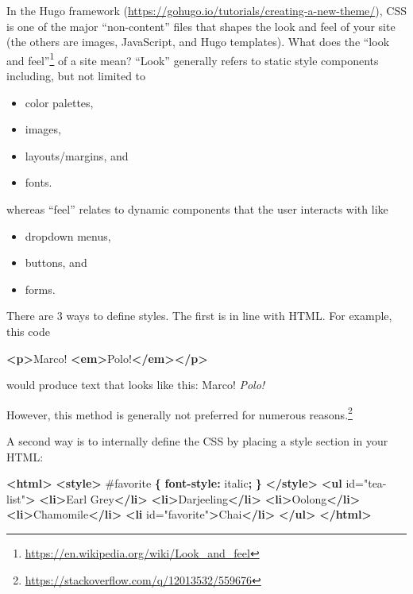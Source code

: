 \documentclass[12pt,]{krantz}
\makeatletter
\newenvironment{Shaded}{\begin{snugshade}}{\end{snugshade}}
\newcommand{\KeywordTok}[1]{\textcolor[rgb]{0.13,0.29,0.53}{\textbf{#1}}}
\newcommand{\DataTypeTok}[1]{\textcolor[rgb]{0.13,0.29,0.53}{#1}}
\newcommand{\FloatTok}[1]{\textcolor[rgb]{0.00,0.00,0.81}{#1}}
\newcommand{\StringTok}[1]{\textcolor[rgb]{0.31,0.60,0.02}{#1}}
\newcommand{\OtherTok}[1]{\textcolor[rgb]{0.56,0.35,0.01}{#1}}
\newcommand{\NormalTok}[1]{#1}
\providecommand{\tightlist}{%
  \setlength{\itemsep}{0pt}\setlength{\parskip}{0pt}}
\renewcommand{\href}[2]{#2\footnote{\url{#1}}}
\newenvironment{kframe}{%
\medskip{}
\setlength{\fboxsep}{.8em}
 \def\at@end@of@kframe{}%
 \ifinner\ifhmode%
  \def\at@end@of@kframe{\end{minipage}}%
  \begin{minipage}{\columnwidth}%
 \fi\fi%
 \def\FrameCommand##1{\hskip\@totalleftmargin \hskip-\fboxsep
 \colorbox{shadecolor}{##1}\hskip-\fboxsep
     \hskip-\linewidth \hskip-\@totalleftmargin \hskip\columnwidth}%
 \MakeFramed {\advance\hsize-\width
   \@totalleftmargin\z@ \linewidth\hsize
   \@setminipage}}%
 {\par\unskip\endMakeFramed%
 \at@end@of@kframe}
\renewenvironment{Shaded}{\begin{kframe}}{\end{kframe}}
\theoremstyle{definition}
\theoremstyle{definition}
\theoremstyle{definition}
\theoremstyle{remark}
\makeatother
\begin{document}
In the Hugo framework
(\url{https://gohugo.io/tutorials/creating-a-new-theme/}), CSS is one of
the major ``non-content'' files that shapes the look and feel of your
site (the others are images, JavaScript, and Hugo templates). What does
the \href{https://en.wikipedia.org/wiki/Look_and_feel}{``look and
feel''} of a site mean? ``Look'' generally refers to static style
components including, but not limited to

\begin{itemize}
\tightlist
\item
  color palettes,
\item
  images,
\item
  layouts/margins, and
\item
  fonts.
\end{itemize}

whereas ``feel'' relates to dynamic components that the user interacts
with like

\begin{itemize}
\tightlist
\item
  dropdown menus,
\item
  buttons, and
\item
  forms.
\end{itemize}

There are 3 ways to define styles. The first is in line with HTML. For
example, this code

\begin{Shaded}
\begin{Highlighting}[]
\KeywordTok{<p>}\NormalTok{Marco! }\KeywordTok{<em>}\NormalTok{Polo!}\KeywordTok{</em></p>} 
\end{Highlighting}
\end{Shaded}

would produce text that looks like this: Marco! \emph{Polo!}

However, this method is generally not preferred for
\href{https://stackoverflow.com/q/12013532/559676}{numerous reasons.}

A second way is to internally define the CSS by placing a style section
in your HTML:

\begin{Shaded}
\begin{Highlighting}[]
\KeywordTok{<html>}
\KeywordTok{<style>} 
\FloatTok{#favorite} \KeywordTok{\{}
    \KeywordTok{font-style:} \DataTypeTok{italic}\KeywordTok{;}
\KeywordTok{\}}
\KeywordTok{</style>}
\KeywordTok{<ul}\OtherTok{ id=}\StringTok{"tea-list"}\KeywordTok{>}
  \KeywordTok{<li>}\NormalTok{Earl Grey}\KeywordTok{</li>}
  \KeywordTok{<li>}\NormalTok{Darjeeling}\KeywordTok{</li>}
  \KeywordTok{<li>}\NormalTok{Oolong}\KeywordTok{</li>}
  \KeywordTok{<li>}\NormalTok{Chamomile}\KeywordTok{</li>}
  \KeywordTok{<li}\OtherTok{ id=}\StringTok{"favorite"}\KeywordTok{>}\NormalTok{Chai}\KeywordTok{</li>}
\KeywordTok{</ul>}
\KeywordTok{</html>}
\end{Highlighting}
\end{Shaded}
\end{document}
